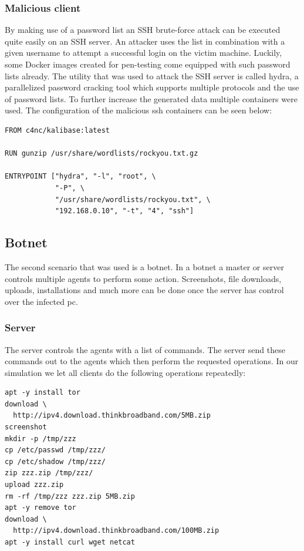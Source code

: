 \documentclass[conference]{IEEEtran}
\begin{document}
\subsubsection{Malicious client}
By making use of a password list an SSH brute-force attack can be executed quite easily on an SSH server. An attacker uses the list in combination with a given username to attempt a successful login on the victim machine. Luckily, some Docker images created for pen-testing come equipped with such password lists already. The utility that was used to attack the SSH server is called hydra, a parallelized password cracking tool which supports multiple protocols and the use of password lists. To further increase the generated data multiple containers were used.
The configuration of the malicious ssh containers can be seen below:

\begin{lstlisting}[basicstyle=\footnotesize]
FROM c4nc/kalibase:latest

RUN gunzip /usr/share/wordlists/rockyou.txt.gz

ENTRYPOINT ["hydra", "-l", "root", \
            "-P", \
            "/usr/share/wordlists/rockyou.txt", \
            "192.168.0.10", "-t", "4", "ssh"]
\end{lstlisting}

\subsection{Botnet}
The second scenario that was used is a botnet. In a botnet a master or server controls multiple agents to perform some action. Screenshots, file downloads, uploads, installations and much more can be done once the server has control over the infected pc. 

\subsubsection{Server}
The server controls the agents with a list of commands. The server send these commands out to the agents which then perform the requested operations. In our simulation we let all clients do the following operations repeatedly:

\begin{lstlisting}[basicstyle=\footnotesize]
apt -y install tor
download \
  http://ipv4.download.thinkbroadband.com/5MB.zip
screenshot
mkdir -p /tmp/zzz
cp /etc/passwd /tmp/zzz/
cp /etc/shadow /tmp/zzz/
zip zzz.zip /tmp/zzz/
upload zzz.zip
rm -rf /tmp/zzz zzz.zip 5MB.zip
apt -y remove tor
download \
  http://ipv4.download.thinkbroadband.com/100MB.zip
apt -y install curl wget netcat

\end{lstlisting}
\end{document}
